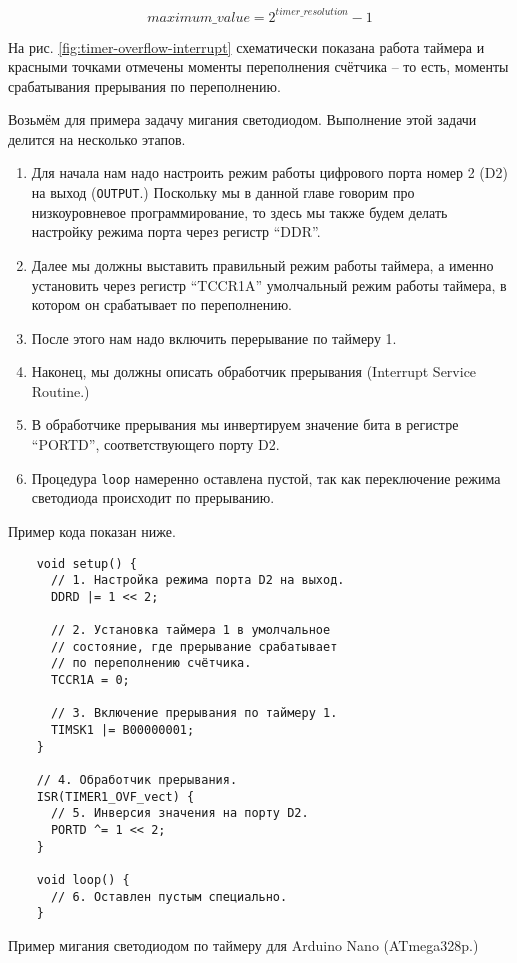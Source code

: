 \documentclass[../sparc.tex]{subfiles}
\begin{document}
\begin{equation}
  maximum\_value = 2^{timer\_resolution} - 1
\end{equation}

На рис. \ref{fig:timer-overflow-interrupt} схематически показана работа таймера
и красными точками отмечены моменты переполнения счётчика -- то есть, моменты
срабатывания прерывания по переполнению.

Возьмём для примера задачу мигания светодиодом.  Выполнение этой задачи делится
на несколько этапов.

\begin{enumerate}
\item Для начала нам надо настроить режим работы цифрового порта номер 2 (D2) на
  выход (\texttt{OUTPUT}.)  Поскольку мы в данной главе говорим про
  низкоуровневое программирование, то здесь мы также будем делать настройку
  режима порта через регистр ``DDR''.
\item Далее мы должны выставить правильный режим работы таймера, а именно
  установить через регистр ``TCCR1A'' умолчальный режим работы таймера, в
  котором он срабатывает по переполнению.
\item После этого нам надо включить перерывание по таймеру 1.
\item Наконец, мы должны описать обработчик прерывания (Interrupt Service
  Routine.)
\item В обработчике прерывания мы инвертируем значение бита в регистре
  ``PORTD'', соответствующего порту D2.
\item Процедура \texttt{loop} намеренно оставлена пустой, так как
  переключение режима светодиода происходит по прерыванию.
\end{enumerate}

Пример кода показан ниже.

\begin{listing}[H]
  \begin{verbatim}
    void setup() {
      // 1. Настройка режима порта D2 на выход.
      DDRD |= 1 << 2;

      // 2. Установка таймера 1 в умолчальное
      // состояние, где прерывание срабатывает
      // по переполнению счётчика.
      TCCR1A = 0;

      // 3. Включение прерывания по таймеру 1.
      TIMSK1 |= B00000001;
    }

    // 4. Обработчик прерывания.
    ISR(TIMER1_OVF_vect) {
      // 5. Инверсия значения на порту D2.
      PORTD ^= 1 << 2;
    }

    void loop() {
      // 6. Оставлен пустым специально.
    }
  \end{verbatim}
  \caption{Пример мигания светодиодом по таймеру для Arduino Nano (ATmega328p.)}
  \label{listing:mcu-timer-example-1}
\end{listing}
\end{document}
